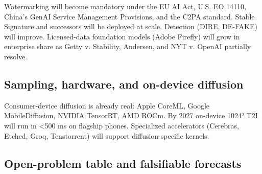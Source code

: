 \documentclass{article}
\begin{document}
Watermarking will become mandatory under the EU AI Act, U.S. EO 14110, China's GenAI Service Management Provisions, and the C2PA standard. Stable Signature \citep{fernandez2023thestablesignature} and successors will be deployed at scale. Detection (DIRE, DE-FAKE) will improve. Licensed-data foundation models (Adobe Firefly) will grow in enterprise share as Getty v. Stability, Andersen, and NYT v. OpenAI partially resolve.

\subsection{Sampling, hardware, and on-device diffusion}\label{sampling-hardware-and-on-device-diffusion}

Consumer-device diffusion is already real: Apple CoreML, Google MobileDiffusion, NVIDIA TensorRT, AMD ROCm. By 2027 on-device 1024² T2I will run in \textless500 ms on flagship phones. Specialized accelerators (Cerebras, Etched, Groq, Tenstorrent) will support diffusion-specific kernels.

\subsection{Open-problem table and falsifiable forecasts}\label{open-problem-table-and-falsifiable-forecasts}
\end{document}
